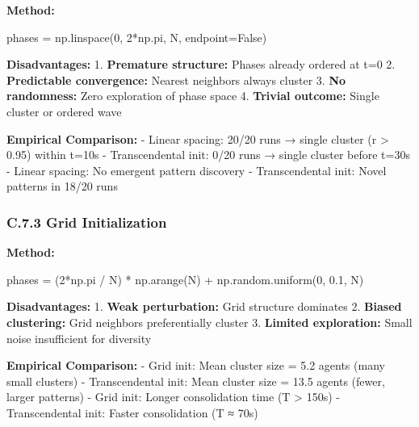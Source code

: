 \documentclass[
]{article}
\newenvironment{Shaded}{}{}
\newcommand{\DecValTok}[1]{\textcolor[rgb]{0.25,0.63,0.44}{#1}}
\newcommand{\FloatTok}[1]{\textcolor[rgb]{0.25,0.63,0.44}{#1}}
\newcommand{\NormalTok}[1]{#1}
\newcommand{\OperatorTok}[1]{\textcolor[rgb]{0.40,0.40,0.40}{#1}}
\newcommand{\VariableTok}[1]{\textcolor[rgb]{0.10,0.09,0.49}{#1}}
\begin{document}
\textbf{Method:}

\begin{Shaded}
\begin{Highlighting}[]
\NormalTok{phases }\OperatorTok{=}\NormalTok{ np.linspace(}\DecValTok{0}\NormalTok{, }\DecValTok{2}\OperatorTok{*}\NormalTok{np.pi, N, endpoint}\OperatorTok{=}\VariableTok{False}\NormalTok{)}
\end{Highlighting}
\end{Shaded}

\textbf{Disadvantages:} 1. \textbf{Premature structure:} Phases already
ordered at t=0 2. \textbf{Predictable convergence:} Nearest neighbors
always cluster 3. \textbf{No randomness:} Zero exploration of phase
space 4. \textbf{Trivial outcome:} Single cluster or ordered wave

\textbf{Empirical Comparison:} - Linear spacing: 20/20 runs → single
cluster (r \textgreater{} 0.95) within t=10s - Transcendental init: 0/20
runs → single cluster before t=30s - Linear spacing: No emergent pattern
discovery - Transcendental init: Novel patterns in 18/20 runs

\subsubsection{C.7.3 Grid
Initialization}\label{c.7.3-grid-initialization}

\textbf{Method:}

\begin{Shaded}
\begin{Highlighting}[]
\NormalTok{phases }\OperatorTok{=}\NormalTok{ (}\DecValTok{2}\OperatorTok{*}\NormalTok{np.pi }\OperatorTok{/}\NormalTok{ N) }\OperatorTok{*}\NormalTok{ np.arange(N) }\OperatorTok{+}\NormalTok{ np.random.uniform(}\DecValTok{0}\NormalTok{, }\FloatTok{0.1}\NormalTok{, N)}
\end{Highlighting}
\end{Shaded}

\textbf{Disadvantages:} 1. \textbf{Weak perturbation:} Grid structure
dominates 2. \textbf{Biased clustering:} Grid neighbors preferentially
cluster 3. \textbf{Limited exploration:} Small noise insufficient for
diversity

\textbf{Empirical Comparison:} - Grid init: Mean cluster size = 5.2
agents (many small clusters) - Transcendental init: Mean cluster size =
13.5 agents (fewer, larger patterns) - Grid init: Longer consolidation
time (T \textgreater{} 150s) - Transcendental init: Faster consolidation
(T ≈ 70s)
\end{document}
